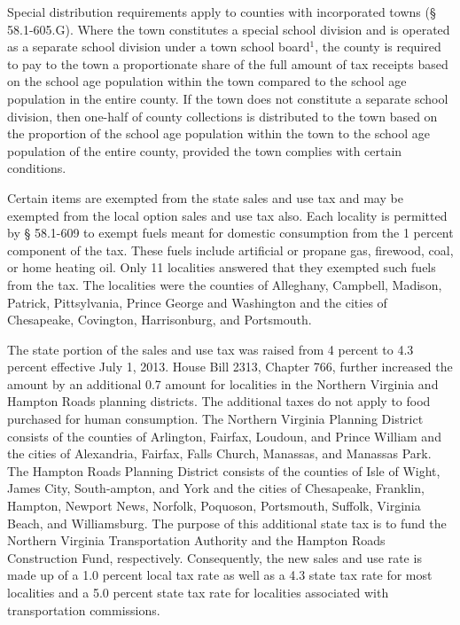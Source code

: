\documentclass[
]{book}
\begin{document}
Special distribution requirements apply to counties with incorporated towns (§ 58.1-605.G). Where the town constitutes a special school division and is operated as a separate school division under a town school board\(^1\), the county is required to pay to the town a proportionate share of the full amount of tax receipts based on the school age population within the town compared to the school age population in the entire county. If the town does not constitute a separate school division, then one-half of county collections is distributed to the town based on the proportion of the school age population within the town to the school age population of the entire county, provided the town complies with certain conditions.

Certain items are exempted from the state sales and use tax and may be exempted from the local option sales and use tax also. Each locality is permitted by § 58.1-609 to exempt fuels meant for domestic consumption from the 1 percent component of the tax. These fuels include artificial or propane gas, firewood, coal, or home heating oil. Only 11 localities answered that they exempted such fuels from the tax. The localities were the counties of Alleghany, Campbell, Madison, Patrick, Pittsylvania, Prince George and Washington and the cities of Chesapeake, Covington, Harrisonburg, and Portsmouth.

The state portion of the sales and use tax was raised from 4 percent to 4.3 percent effective July 1, 2013. House Bill 2313, Chapter 766, further increased the amount by an additional 0.7 amount for localities in the Northern Virginia and Hampton Roads planning districts. The additional taxes do not apply to food purchased for human consumption. The Northern Virginia Planning District consists of the counties of Arlington, Fairfax, Loudoun, and Prince William and the cities of Alexandria, Fairfax, Falls Church, Manassas, and Manassas Park. The Hampton Roads Planning District consists of the counties of Isle of Wight, James City, South-ampton, and York and the cities of Chesapeake, Franklin, Hampton, Newport News, Norfolk, Poquoson, Portsmouth, Suffolk, Virginia Beach, and Williamsburg. The purpose of this additional state tax is to fund the Northern Virginia Transportation Authority and the Hampton Roads Construction Fund, respectively. Consequently, the new sales and use rate is made up of a 1.0 percent local tax rate as well as a 4.3 state tax rate for most localities and a 5.0 percent state tax rate for localities associated with transportation commissions.
\end{document}
